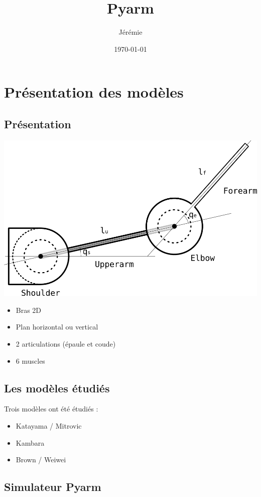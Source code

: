 \documentclass[pdftex,a4paper,11pt]{article}
\begin{document}
\title{Pyarm}
\author{
	Jérémie 
}
\date{\today{}}

\maketitle


\section{Présentation des modèles}

\subsection{Présentation}

\begin{center}
        \includegraphics[width=.40\linewidth]{fig/arm}
\end{center}

\begin{itemize}
    \item Bras 2D
    \item Plan horizontal ou vertical
    \item 2 articulations (épaule et coude)
    \item 6 muscles
\end{itemize}

\subsection{Les modèles étudiés}
Trois modèles ont été étudiés :
\begin{itemize}
    \item Katayama / Mitrovic %
    \item Kambara %
    \item Brown / Weiwei %
\end{itemize}

\subsection{Simulateur Pyarm}
\end{document}
